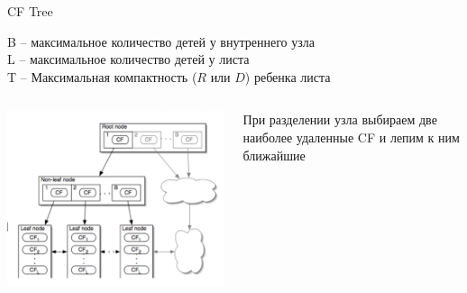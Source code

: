 \documentclass[aspectratio=169]{beamer}
\begin{document}
\begin{frame}{CF Tree}

B --  максимальное количество детей у внутреннего узла \\
L -- максимальное количество детей у листа \\
T -- Максимальная компактность ($R$ или $D$) ребенка листа

\begin{columns}[]
  \begin{column}{.6\textwidth}
  \begin{center}
   		\includegraphics[height=0.7\textheight]{images/cftree.png}
    \end{center}
		
  \end{column}       
  \begin{column}{.4\textwidth}
  При разделении узла выбираем две наиболее удаленные CF и	лепим к ним ближайшие
  \end{column}
\end{columns}

\end{frame}
\end{document}
